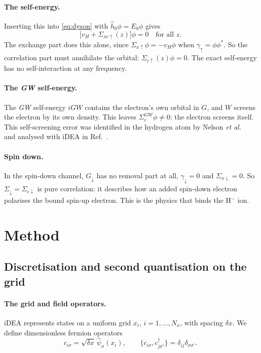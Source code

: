 \documentclass[11pt,a4paper]{article}
\newcommand{\GW}{\textit{GW}}
\newcommand{\iDEA}{iDEA}
\newcommand{\dx}{\delta x}
\newcommand{\Nx}{N_x}
\newcommand{\up}{{\uparrow}}
\newcommand{\dn}{{\downarrow}}
\begin{document}
\paragraph{The self-energy.} Inserting this into \cref{eq:dyson} with $\hat h_0\phi = E_0\phi$ gives
\begin{equation}
\big[v_H + \Sigma_{xc\up}(z)\big]\phi = 0 \quad\text{for all } z.
\end{equation}
The exchange part does this alone, since $\Sigma_{x\up}\phi = -v_H\phi$ when $\gamma_\up = \phi\phi^*$. So the correlation part must annihilate the orbital: $\Sigma_{c\up}(z)\phi = 0$. The exact self-energy has no self-interaction at any frequency.

\paragraph{The \GW{} self-energy.} The \GW{} self-energy $iGW$ contains the electron's own orbital in $G$, and $W$ screens the electron by its own density. This leaves $\Sigma_c^{\GW}\phi\ne0$: the electron screens itself. This self-screening error was identified in the hydrogen atom by Nelson \emph{et al.}~\cite{nelson2007} and analysed with \iDEA{} in Ref.~\cite{wetherell2018}.

\paragraph{Spin down.} In the spin-down channel, $G_\dn$ has no removal part at all, $\gamma_\dn = 0$ and $\Sigma_{x\dn} = 0$. So $\Sigma_\dn = \Sigma_{c\dn}$ is pure correlation: it describes how an added spin-down electron polarises the bound spin-up electron. This is the physics that binds the H$^-$ ion.

\section{Method}
\label{sec:method}

\subsection{Discretisation and second quantisation on the grid}

\paragraph{The grid and field operators.} \iDEA{} represents states on a uniform grid $x_i$, $i=1,\dots,\Nx$, with spacing $\dx$. We define dimensionless fermion operators
\begin{equation}
c_{i\sigma} = \sqrt{\dx}\,\hat\psi_\sigma(x_i), \qquad \{c_{i\sigma},c^\dagger_{j\sigma'}\} = \delta_{ij}\delta_{\sigma\sigma'}.
\end{equation}
\end{document}

